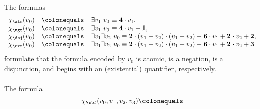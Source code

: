 \begin{enumerate}[1.]
The formulas
\[
\begin{array}{lll}
\chi_\atm (v_0) & \colonequals & \exists v_1 \ v_0 \equiv \mathbf{4} \cdot v_1, \cr
\chi_\ngt (v_0) & \colonequals & \exists v_1 \ v_0 \equiv \mathbf{4} \cdot v_1 + 1, \cr
\chi_\dsj (v_0) & \colonequals & \exists v_1 \exists v_2 \ v_0 \equiv \mathbf{2} \cdot (v_1 + v_2) \cdot (v_1 + v_2) + \mathbf{6} \cdot v_1 + \mathbf{2} \cdot v_2 + \mathbf{2}, \cr
\chi_\ext (v_0) & \colonequals & \exists v_1 \exists v_2 \ v_0 \equiv \mathbf{2} \cdot (v_1 + v_2) \cdot (v_1 + v_2) + \mathbf{6} \cdot v_1 + \mathbf{2} \cdot v_2 + \mathbf{3}
\end{array}
\]
formulate that the formula encoded by $v_0$ is atomic, is a negation, is a disjunction, and begins with an (existential) quantifier, respectively.\\
\ \\
The formula
\[
\chi_\sbf (v_0, v_1, v_2, v_3) \colonequals
\]


\end{enumerate}
